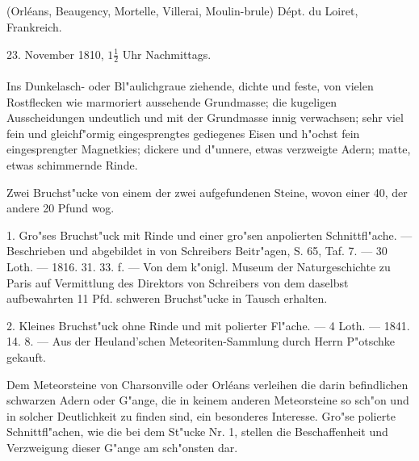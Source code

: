 \documentclass[a4paper, 11pt, oneside, polutonikogreek, german]{article}
\begin{document}
\setlength{\leftskip}{0pt}
\setlength{\parindent}{20pt}

\subsection{}
\begin{center}

(Orléans, Beaugency, Mortelle, Villerai, Moulin-brule) Dépt. du Loiret, Frankreich.

23. November 1810, $\mathfrak{1\frac{1}{2}}$ Uhr Nachmittags.
\end{center}
\paragraph{}
Ins Dunkelasch- oder Bl"aulichgraue ziehende, dichte und feste, von vielen Rostflecken wie marmoriert aussehende Grundmasse; die kugeligen Ausscheidungen undeutlich und mit der Grundmasse innig verwachsen; sehr viel fein und gleichf"ormig eingesprengtes gediegenes Eisen und h"ochst fein eingesprengter Magnetkies; dickere und d"unnere, etwas verzweigte Adern; matte, etwas schimmernde Rinde.

Zwei Bruchst"ucke von einem der zwei aufgefundenen Steine, wovon einer 40, der andere 20 Pfund wog.

1. Gro"ses Bruchst"uck mit Rinde und einer gro"sen anpolierten Schnittfl"ache. --- Beschrieben und abgebildet in von Schreibers Beitr"agen, S. 65, Taf. 7. --- 30 Loth. --- 1816. 31. 33. f. --- Von dem k"onigl. Museum der Naturgeschichte zu Paris auf Vermittlung des Direktors von Schreibers von dem daselbst aufbewahrten 11 Pfd. schweren Bruchst"ucke in Tausch erhalten.

2. Kleines Bruchst"uck ohne Rinde und mit polierter Fl"ache. --- 4 Loth. --- 1841. 14. 8. --- Aus der Heuland'schen Meteoriten-Sammlung durch Herrn P"otschke gekauft.

\setlength{\leftskip}{10mm}
\setlength{\parindent}{0pt}

{\footnotesize Dem Meteorsteine von Charsonville oder Orléans verleihen die darin befindlichen schwarzen Adern oder G"ange, die in keinem anderen Meteorsteine so sch"on und in solcher Deutlichkeit zu finden sind, ein besonderes Interesse. Gro"se polierte Schnittfl"achen, wie die bei dem St"ucke Nr. 1, stellen die Beschaffenheit und Verzweigung dieser G"ange am sch"onsten dar.}

\setlength{\leftskip}{0pt}
\setlength{\parindent}{20pt}
\end{document}

